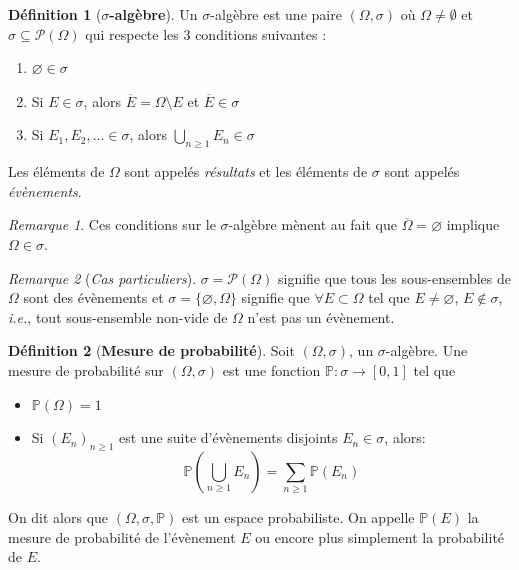 \documentclass[12pt,a4paper]{report}
\theoremstyle{definition}
\newtheorem{definition}{Définition}[chapter]
\theoremstyle{remark}
\newtheorem{remark}{Remarque}[chapter]
\newcommand{\ie}{\textit{i.e.}, }
\let\labelitemi\labelitemii
\begin{document}
\begin{definition}[\textbf{$\sigma$-algèbre}]
	Un $\sigma$-algèbre est une paire $(\Omega, \sigma)$ où $\Omega \neq \emptyset $ et $\sigma \subseteq \mathcal{P}(\Omega)$ qui respecte les $3$ conditions suivantes :
	\begin{enumerate}
		\item $\varnothing \in \sigma$
		\item Si $E \in \sigma$, alors $\overline{E} = \Omega \setminus E$ et $\overline{E} \in \sigma$
		\item Si $E_1, E_2, \dots \in \sigma$, alors $\bigcup_{n \geq 1} E_n \in \sigma$
	\end{enumerate}
	Les éléments de $\Omega$ sont appelés \textit{résultats} et les éléments de $\sigma$ sont appelés \textit{évènements}.
\end{definition}

\begin{remark}
	Ces conditions sur le $\sigma$-algèbre mènent au fait que $\overline{\Omega} = \varnothing$ implique $\Omega \in \sigma$.
\end{remark}
\begin{remark}[\textit{Cas particuliers}]
		$\sigma = \mathcal{P}(\Omega)$ signifie que tous les sous-ensembles de $\Omega$ sont des évènements et 
		$\sigma = \{\varnothing, \Omega\}$ signifie que $\forall E \subset \Omega$ tel que $E \neq \varnothing$, $E \notin \sigma$, \ie tout sous-ensemble non-vide de $\Omega$ n'est pas un évènement.
\end{remark}

\begin{definition}[\textbf{Mesure de probabilité}]\label{proba_measure} Soit $(\Omega, \sigma)$, un $\sigma$-algèbre.
	Une mesure de probabilité sur $(\Omega, \sigma)$ est une fonction $\mathbb{P} : \sigma \rightarrow [0, 1]$ tel que
	\begin{itemize}
		\renewcommand{\labelitemi}{\tiny$\bullet$}
		\item $\mathbb{P}(\Omega) = 1$
		\item Si $(E_n)_{n \geq 1}$ est une suite d'évènements disjoints $E_n \in \sigma$, alors:
		\[\mathbb{P}(\bigcup_{n \geq 1} E_n) = \sum_{n \geq 1} \mathbb{P}(E_n)\]
	\end{itemize}
	On dit alors que $(\Omega, \sigma, \mathbb{P})$ est un espace probabiliste.
	On appelle $\mathbb{P}(E)$ la mesure de probabilité de l'évènement $E$ ou encore plus simplement la probabilité de $E$.
\end{definition}
\end{document}
